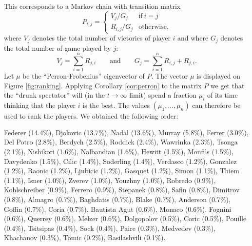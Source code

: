 \documentclass[11pt,nocut]{article}
\begin{document}
This corresponds to a Markov chain with transition matrix
$$
P_{i,j} = 
\begin{cases}
	V_j/G_j & \text{if} \ i = j \\
	R_{i,j}/G_j & \text{otherwise,}
\end{cases}
$$
where $V_j$ denotes the total number of victories of player $i$ and where $G_j$ denotes the total number of game played by $j$:
$$
V_{j} = \sum_{i=1}^n R_{j,i} \qquad \text{and} \qquad G_j = \sum_{i=1}^n R_{i,j} + R_{j,i}.
$$
Let $\mu$ be the ``Perron-Frobenius'' eigenvector of $P$. The vector $\mu$ is displayed on Figure \ref{fig:ranking}.
Applying Corollary \ref{cor:perron} to the matrix $P$ we get that the ``drunk spectator'' will (in the $t \to \infty$ limit) spend a fraction $\mu_i$ of its time thinking that the player $i$ is the best. The values $(\mu_1, \dots, \mu_n)$ can therefore be used to rank the players. We obtained the following order:
\begin{center}
Federer (14.4\%),
Djokovic (13.7\%),
Nadal (13.6\%),
Murray (5.8\%),
Ferrer (3.0\%),
Del Potro (2.8\%),
Berdych (2.5\%),
Roddick (2.4\%),
Wawrinka (2.3\%),
Tsonga (2.1\%),
Nishikori (1.6\%),
Nalbandian (1.6\%),
Hewitt (1.5\%),
Monfils (1.5\%),
Davydenko (1.5\%),
Cilic (1.4\%),
Soderling (1.4\%),
Verdasco (1.2\%),
Gonzalez (1.2\%),
Raonic (1.2\%),
Ljubicic (1.2\%),
Gasquet (1.2\%),
Simon (1.1\%),
Thiem (1.1\%),
Isner (1.0\%),
Zverev (1.0\%),
Youzhny (1.0\%),
Robredo (0.9\%),
Kohlschreiber (0.9\%),
Ferrero (0.9\%),
Stepanek (0.8\%),
Safin (0.8\%),
Dimitrov (0.8\%),
Almagro (0.7\%),
Baghdatis (0.7\%),
Blake (0.7\%),
Anderson (0.7\%),
Goffin (0.7\%),
Coria (0.7\%),
Bautista Agut (0.6\%),
Monaco (0.6\%),
Fognini (0.6\%),
Querrey (0.6\%),
Melzer (0.6\%),
Dolgopolov (0.5\%),
Coric (0.5\%),
Pouille (0.4\%),
Tsitsipas (0.4\%),
Sock (0.4\%),
Paire (0.3\%),
Medvedev (0.3\%),
Khachanov (0.3\%),
Tomic (0.2\%),
Basilashvili (0.1\%).
\end{center}
\end{document}
